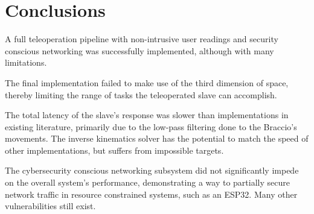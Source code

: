 \chapter{Conclusions}\label{ch:conc}



A full teleoperation pipeline with non-intrusive user readings and  security conscious networking was successfully implemented, although with many limitations.

The final implementation failed to make use of the third dimension of space, thereby limiting the range of tasks the teleoperated slave can accomplish.

The total latency of the slave's response was slower than implementations in existing literature, primarily due to the low-pass filtering done to the Braccio's movements. The inverse kinematics solver has the potential to match the speed of other implementations, but suffers from impossible targets.

The cybersecurity conscious networking subsystem did not significantly impede on the overall system's performance, demonstrating a way to partially secure network traffic in resource constrained systems, such as an ESP32. Many other vulnerabilities still exist.
